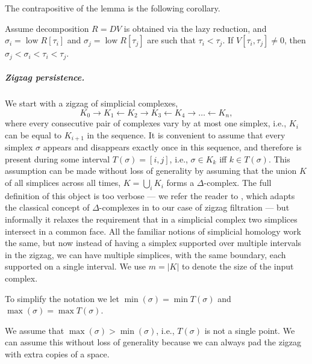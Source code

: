 \documentclass[cleveref,a4paper,english,nolineno]{socg-lipics-v2021}
\newcommand{\ot}{\leftarrow}
\renewcommand{\paragraph}[1]{\subparagraph*{#1}}
\newcommand{\low}{\operatorname{low}}
\newcommand{\ssx}{\sigma}
\newcommand{\tsx}{\tau}
\begin{document}
The contrapositive of the lemma is the following corollary.
\begin{corollary}
    \label{cor:lazy-nested}
    Assume decomposition $R = DV$ is obtained via the lazy reduction,
    and $\ssx_i = \low R[\tsx_i]$ and $\ssx_j = \low R[\tsx_j]$ are such that
    $\tsx_i < \tsx_j$. If
    $V[\tsx_i, \tsx_j] \neq 0$, then $\ssx_j < \ssx_i < \tsx_i < \tsx_j$.
\end{corollary}


\paragraph{Zigzag persistence.}
We start with a zigzag of simplicial complexes,
\begin{equation}
    \label{eq:space-zigzag}
    K_0 \to K_1 \ot K_2 \to K_3 \ot K_4 \to \ldots \ot K_n,
\end{equation}
where every consecutive pair of complexes vary by at most one simplex, i.e.,
$K_i$ can be equal to $K_{i+1}$ in the sequence.
It is convenient to assume that every simplex $\ssx$ appears and disappears exactly
once in this sequence, and therefore is present during some interval $T(\ssx) =
[i,j]$, i.e., $\ssx \in K_k$ iff $k \in T(\ssx)$. This assumption can be
made without loss of generality by assuming that the union $K$ of all simplices
across all times, $K = \bigcup_i K_i$ forms a $\Delta$-complex.
The full
definition of this object is too verbose --- we refer the reader to \cite{DH22},
which adapts the classical concept of $\Delta$-complexes in
\cite[p.~103]{Hat02} to our case of zigzag filtration --- but informally it relaxes the requirement that in a
simplicial complex two simplices intersect in a common face. All the familiar
notions of simplicial homology work the same, but now instead of having a
simplex supported over multiple intervals in the zigzag, we can have multiple
simplices, with the same boundary, each supported on a single interval.
We use $m = |K|$ to denote the size of the input complex.

\begin{remark*}
To simplify the notation we let $\min(\ssx) = \min T(\ssx)$ and $\max(\ssx) = \max T(\ssx)$.
\end{remark*}

\begin{remark}
    \label{rmk:generic-time-intervals}
    We assume that $\max(\ssx) > \min(\ssx)$, i.e., $T(\ssx)$ is not a
    single point. We can assume this without loss of generality because we can
    always pad the zigzag with extra copies of a space.
\end{remark}
\end{document}
